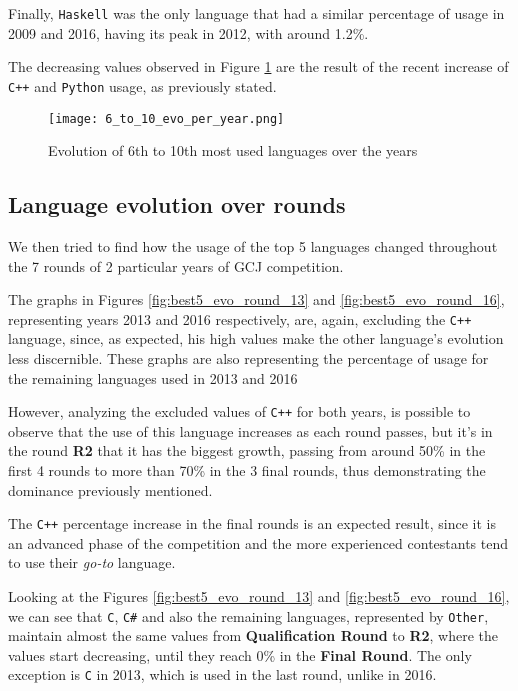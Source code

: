 \documentclass{article}
\begin{document}
\begin{multicols*}{2}
Finally, \texttt{Haskell} was the only language that had a similar percentage of usage in 2009 and 2016, having its peak in 2012, with around 1.2\%.

The decreasing values observed in Figure \ref{fig:6_to_10_evo} are the result of the recent increase of \texttt{C++} and \texttt{Python} usage, as previously stated.

\begin{figure}[H]
    \centering
    \texttt{[image: 6\_to\_10\_evo\_per\_year.png]}
    \caption{Evolution of 6th to 10th most used languages over the years}
    \label{fig:6_to_10_evo}
\end{figure}


\subsection{Language evolution over rounds}

We then tried to find how the usage of the top 5 languages changed throughout the 7 rounds of 2 particular years of GCJ competition.

The graphs in Figures \ref{fig:best5_evo_round_13} and \ref{fig:best5_evo_round_16}, representing years 2013 and 2016 respectively, are, again, excluding the \texttt{C++} language, since, as expected, his high values make the other language's evolution less discernible.
These graphs are also representing the percentage of usage for the remaining languages used in 2013 and 2016


However, analyzing the excluded values of \texttt{C++} for both years, is possible to observe that the use of this language increases as each round passes, but it's in the round \textbf{R2} that it has the biggest growth, passing from around 50\% in the first 4 rounds to more than 70\% in the 3 final rounds, thus demonstrating the dominance previously mentioned.

The \texttt{C++} percentage increase in the final rounds is an expected result, since it is an advanced phase of the competition and the more experienced contestants tend to use their \textit{go-to} language.


Looking at the Figures \ref{fig:best5_evo_round_13} and \ref{fig:best5_evo_round_16}, we can see that \texttt{C}, \texttt{C\#} and also the remaining languages, represented by \texttt{Other}, maintain almost the same values from \textbf{Qualification Round} to \textbf{R2}, where the values start decreasing, until they reach 0\% in the \textbf{Final Round}. The only exception is \texttt{C} in 2013, which is used in the last round, unlike in 2016.


\end{multicols*}
\end{document}
